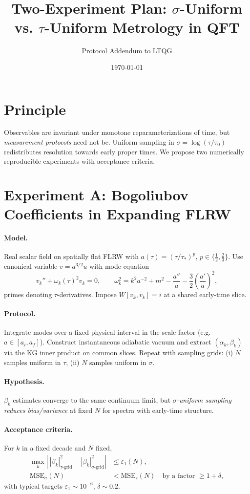 \documentclass[11pt]{article}
\title{Two-Experiment Plan: $\sigma$-Uniform vs. $\tau$-Uniform Metrology in QFT}
\author{Protocol Addendum to LTQG}
\date{\today}
\begin{document}
\maketitle

\section*{Principle}
Observables are invariant under monotone reparameterizations of time, but \emph{measurement protocols} need not be.
Uniform sampling in $\sigma=\log(\tau/\tau_0)$ redistributes resolution towards early proper times.
We propose two numerically reproducible experiments with acceptance criteria.

\section{Experiment A: Bogoliubov Coefficients in Expanding FLRW}
\paragraph{Model.}
Real scalar field on spatially flat FLRW with $a(\tau)= (\tau/\tau_*)^p$, $p\in\{\tfrac12,\tfrac23\}$.
Use canonical variable $v=a^{3/2}u$ with mode equation
\begin{equation}
 v_k'' + \omega_k(\tau)^2 v_k = 0,\qquad \omega_k^2 = k^2 a^{-2} + m^2 - \frac{a''}{a} - \frac{3}{2}\left(\frac{a'}{a}\right)^{\!\!2},
\end{equation}
primes denoting $\tau$-derivatives.
Impose $W[v_k,\bar v_k]=i$ at a shared early-time slice.

\paragraph{Protocol.}
Integrate modes over a fixed physical interval in the scale factor (e.g.\ $a\in[a_i,a_f]$).
Construct instantaneous adiabatic vacuum and extract $(\alpha_k,\beta_k)$ via the KG inner product on common slices.
Repeat with sampling grids:
(i) $N$ samples uniform in $\tau$, (ii) $N$ samples uniform in $\sigma$.

\paragraph{Hypothesis.}
$\beta_k$ estimates converge to the same continuum limit, but \emph{$\sigma$-uniform sampling reduces bias/variance} at fixed $N$ for spectra with early-time structure.

\paragraph{Acceptance criteria.}
For $k$ in a fixed decade and $N$ fixed,
\begin{align}
 \max_k \left|\ |\beta_k|^2_{\tau\text{-grid}} - |\beta_k|^2_{\sigma\text{-grid}}\right| &\le \varepsilon_1(N),\\
 \text{MSE}_\sigma(N) &< \text{MSE}_\tau(N) \quad \text{by a factor }\ge 1+\delta,
\end{align}
with typical targets $\varepsilon_1\sim 10^{-6}$, $\delta\sim 0.2$.
\end{document}
